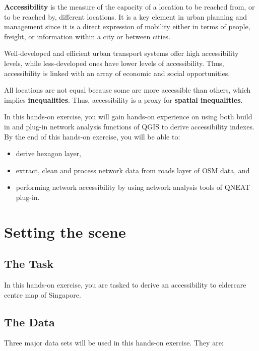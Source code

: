 \documentclass[
  letterpaper,
  DIV=11,
  numbers=noendperiod]{scrreprt}
\providecommand{\tightlist}{%
  \setlength{\itemsep}{0pt}\setlength{\parskip}{0pt}}\usepackage{longtable,booktabs,array}
\begin{document}
\textbf{Accessibility} is the measure of the capacity of a location to
be reached from, or to be reached by, different locations. It is a key
element in urban planning and management since it is a direct expression
of mobility either in terms of people, freight, or information within a
city or between cities.

Well-developed and efficient urban transport systems offer high
accessibility levels, while less-developed ones have lower levels of
accessibility. Thus, accessibility is linked with an array of economic
and social opportunities.

All locations are not equal because some are more accessible than
others, which implies \textbf{inequalities}. Thus, accessibility is a
proxy for \textbf{spatial inequalities}.

In this hands-on exercise, you will gain hands-on experience on using
both build in and plug-in network analysis functions of QGIS to derive
accessibility indexes. By the end of this hands-on exercise, you will be
able to:

\begin{itemize}
\tightlist
\item
  derive hexagon layer,
\item
  extract, clean and process network data from roads layer of OSM data,
  and
\item
  performing network accessibility by using network analysis tools of
  QNEAT plug-in.
\end{itemize}

\hypertarget{setting-the-scene-2}{%
\section{Setting the scene}\label{setting-the-scene-2}}

\hypertarget{the-task-3}{%
\subsection{The Task}\label{the-task-3}}

In this hands-on exercise, you are tasked to derive an accessibility to
eldercare centre map of Singapore.

\hypertarget{the-data-3}{%
\subsection{The Data}\label{the-data-3}}

Three major data sets will be used in this hands-on exercise. They are:
\end{document}
